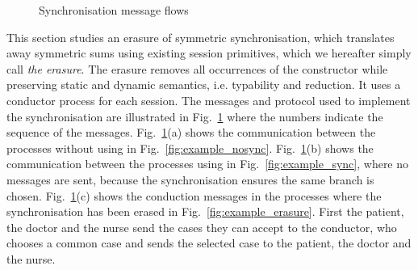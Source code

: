 \newcommand{\eraseGk}[1]{\ensuremath{\left\llbracket #1 \right\rrbracket}}
\newcommand{\eraseUk}[1]{\ensuremath{\left\llbracket #1 \right\rrbracket}}
\newcommand{\eraseTk}[1]{\ensuremath{\left\llbracket #1 \right\rrbracket}}
\newcommand{\erasePk}[1]{\ensuremath{\mathcal{E}\left\llbracket #1 \right\rrbracket}}
\newcommand{\eraseCk}[1]{\ensuremath{\mathcal{C}\left\llbracket #1 \right\rrbracket}}
\newcommand{\eraseGammak}[1]{\ensuremath{\left\llbracket #1 \right\rrbracket}}
\newcommand{\eraseDeltak}[1]{\ensuremath{\left\llbracket #1 \right\rrbracket}}
\begin{figure}[t] \begin{center}
\end{center}
\vspace{-5mm}
\caption{Synchronisation message flows}
\label{fig:choice}
\end{figure} This section studies an erasure of symmetric synchronisation, which 
translates away symmetric sums using existing session primitives, which we
hereafter simply call {\em the erasure}. The erasure removes all occurrences of
the  constructor while preserving static and dynamic semantics, i.e.
typability and reduction. It uses a conductor process for each
session. The messages and protocol used to implement the
synchronisation are illustrated in Fig.~\ref{fig:choice} where the numbers
indicate the sequence of the messages.
Fig.~\ref{fig:choice}(a) shows the communication between the processes
without using  in Fig.~\ref{fig:example_nosync}.
Fig.~\ref{fig:choice}(b) shows the communication between the processes
using  in Fig.~\ref{fig:example_sync}, where no messages are sent, because
the synchronisation ensures the same branch is chosen.
Fig.~\ref{fig:choice}(c) shows the conduction messages in the
processes where the synchronisation has been erased in
Fig.~\ref{fig:example_erasure}. First the patient, the doctor and the
nurse send the cases they can accept to the conductor, who chooses a common
case and sends the selected case to the patient, the doctor and the nurse.

